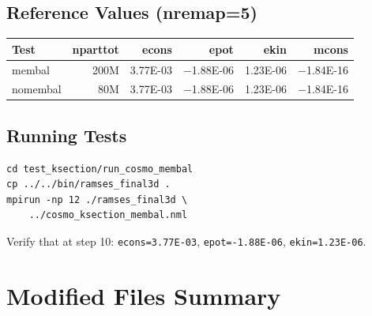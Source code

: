 \documentclass[11pt,fleqn]{book}
\begin{document}
\section{Reference Values (nremap=5)}

\begin{center}
\begin{tabular}{lrrrrr}
\toprule
\textbf{Test} & \textbf{nparttot} & \textbf{econs} & \textbf{epot} & \textbf{ekin} & \textbf{mcons} \\
\midrule
membal & 200M & 3.77E-03 & $-$1.88E-06 & 1.23E-06 & $-$1.84E-16 \\
nomembal & 80M & 3.77E-03 & $-$1.88E-06 & 1.23E-06 & $-$1.84E-16 \\
\bottomrule
\end{tabular}
\end{center}

\section{Running Tests}

\begin{codebox}
\begin{lstlisting}[style=bash,numbers=none]
cd test_ksection/run_cosmo_membal
cp ../../bin/ramses_final3d .
mpirun -np 12 ./ramses_final3d \
    ../cosmo_ksection_membal.nml
\end{lstlisting}
\end{codebox}

Verify that at step 10: \texttt{econs=3.77E-03}, \texttt{epot=-1.88E-06}, \texttt{ekin=1.23E-06}.


\appendix

\chapter{Modified Files Summary}
\end{document}
